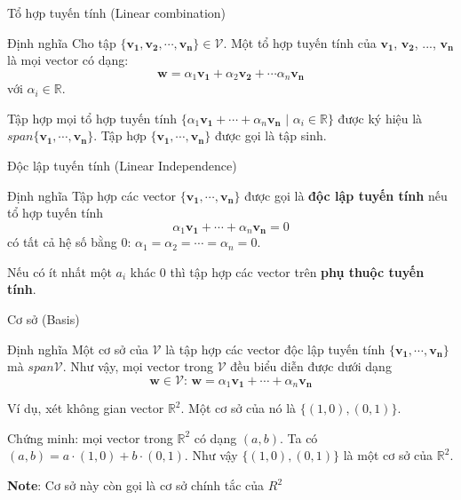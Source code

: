\begin{frame}{Tổ hợp tuyến tính (Linear combination)}
    \begin{block}{Định nghĩa}
        Cho tập $\{\bm{v_1}, \bm{v_2}, \cdots, \bm{v_n}\} \in \mathcal{V}$. Một tổ hợp tuyến tính của $\bm{v_1}$, $\bm{v_2}$, ..., $\bm{v_n}$ là mọi vector có dạng: \[\bm{w}=\alpha_1 \bm{v_1} + \alpha_2 \bm{v_2} + \cdots \alpha_n \bm{v_n}\] với $\alpha_i \in \mathbb{R}$.
    
    Tập hợp mọi tổ hợp tuyến tính $\{ \alpha_1 \bm{v_1} + \cdots + \alpha_n \bm{v_n} \text{ | } \alpha_i \in \mathbb{R}\}$ được ký hiệu là $span \{\bm{v_1}, \cdots, \bm{v_n}\}$. Tập hợp $\{\bm{v_1}, \cdots, \bm{v_n}\}$ được gọi là tập sinh.
    \end{block}
\end{frame}

\begin{frame}{Độc lập tuyến tính (Linear Independence)}
    \begin{block}{Định nghĩa}
        Tập hợp các vector $\{\bm{v_1}, \cdots, \bm{v_n} \}$ được gọi là \textbf{độc lập tuyến tính} nếu tổ hợp tuyến tính \[\alpha_1 \bm{v_1} + \cdots + \alpha_n \bm{v_n} = 0\] có tất cả hệ số bằng 0: $\alpha_1 = \alpha_2 = \cdots = \alpha_n = 0$.
    
        Nếu có ít nhất một $a_i$ khác 0 thì tập hợp các vector trên \textbf{phụ thuộc tuyến tính}.
    \end{block}
\end{frame}

\begin{frame}{Cơ sở (Basis)}
    \begin{block}{Định nghĩa}
        Một cơ sở của $\mathcal{V}$ là tập hợp các vector độc lập tuyến tính $\{\bm{v_1}, \cdots, \bm{v_n}\}$ mà $span \mathcal{V}$. Như vậy, mọi vector trong $\mathcal{V}$ đều biểu diễn được dưới dạng \[\bm{w} \in \mathcal{V} \text{: } \bm{w}=\alpha_1 \bm{v_1} + \cdots + \alpha_n \bm{v_n}\]
    \end{block}
    
    Ví dụ, xét không gian vector $\mathbb{R}^2$. Một cơ sở của nó là $\{(1, 0), (0, 1)\}$.
    
    Chứng minh: mọi vector trong $\mathbb{R}^2$ có dạng $(a, b)$. Ta có $(a, b) = a \cdot (1, 0)+b \cdot (0,1)$. Như vậy $\{(1, 0), (0, 1)\}$ là một cơ sở của $\mathbb{R}^2$.
    
    \textbf{Note}: Cơ sở này còn gọi là cơ sở chính tắc của $\mathbb{}{R}^2$
\end{frame}

